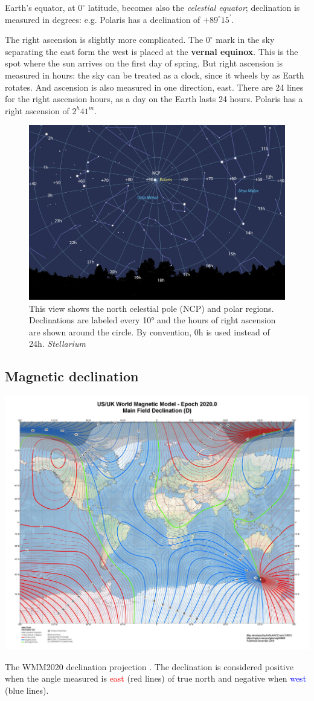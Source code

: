 \documentclass[]{article}
\begin{document}
Earth's equator, at $ 0^{\circ} $ latitude, becomes also the
 \textit{celestial equator};   declination is measured in degrees: e.g. Polaris has a declination of $ +89^{\circ}  15^{\prime} $. 

The right ascension is slightly more complicated. The $0^{\circ}$ mark in the sky separating the east form the west is placed at the \textbf{vernal equinox}. This is the spot where the sun arrives on the first day of spring. But right ascension is measured in hours: the sky can be treated as a clock, since it wheels by as Earth rotates. And ascension is also measured in one direction, east. There are 24 lines for the right ascension hours, as a day on the Earth lasts 24 hours. Polaris has a right ascension of $2^h 41^m$.

\begin{figure}[h!]
	\centering
	\includegraphics[width=0.5\linewidth]{images/background/RA-Dec-celestial-pole.jpg}
	\caption{This view shows the north celestial pole (NCP) and polar regions. Declinations are labeled every 10° and the hours of right ascension are shown around the circle. By convention, 0h is used instead of 24h. 
		\textit{Stellarium}}
	\label{fig:stellarium}
\end{figure}
\fi 

\subsection{Magnetic declination} \label{sec:mag_decl}
\begin{floatingfigure}[r]{0.4\linewidth}
	\centering
	\includegraphics[width=0.37\linewidth]{images/background/wmm2020model.jpg}
	\caption{The WMM2020 declination projection \cite{wmm2020}. The declination is considered positive when the angle measured is \textcolor{red}{east} (red lines) of true north and negative when \textcolor{blue}{west} (blue lines).\\}
\end{floatingfigure}
\end{document}
